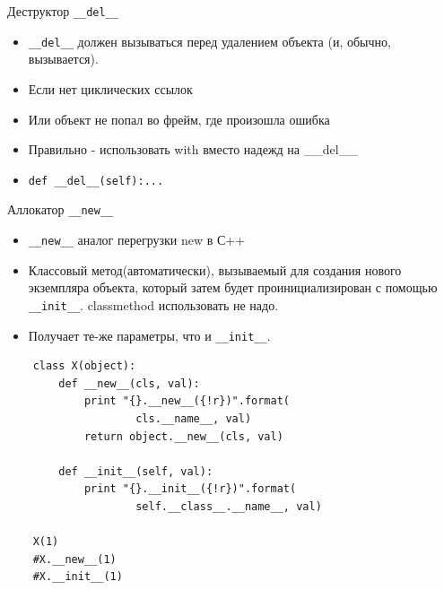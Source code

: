 \documentclass{article}
\begin{document}
\begin{center} Деструктор \lstinline!__del__! \end{center}
\begin{itemize}
    \item \lstinline!__del__! должен вызываться перед удалением объекта 
        (и, обычно, вызывается).
    \item Если нет циклических ссылок
    \item Или объект не попал во фрейм, где произошла ошибка
    \item Правильно - использовать with вместо надежд на \_\_del\_\_
    \item \lstinline!def __del__(self):...!
\end{itemize}
\newpage

\begin{center} Аллокатор \lstinline!__new__! \end{center}
\begin{itemize}
    \item \lstinline!__new__! аналог перегрузки new в С++
    \item Классовый метод(автоматически), вызываемый для создания 
        нового экземпляра объекта, который затем будет проинициализирован 
        с помощью \lstinline!__init__!. classmethod использовать не надо.
    \item Получает те-же параметры, что и \lstinline!__init__!.
\end{itemize}
\vspace{15pt}
\begin{lstlisting}
    class X(object):
        def __new__(cls, val):
            print "{}.__new__({!r})".format(
                    cls.__name__, val)
            return object.__new__(cls, val)
        
        def __init__(self, val):
            print "{}.__init__({!r})".format(
                    self.__class__.__name__, val)

    X(1)
    #X.__new__(1)
    #X.__init__(1)
\end{lstlisting}
\end{document}
